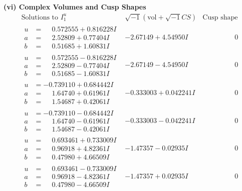 \documentclass[1p]{elsarticle_modified}
\theoremstyle{definition}
\newcommand{\I}{\sqrt{-1}}
\begin{document}
\newpage\flushleft \textbf{(vi) Complex Volumes and Cusp Shapes}
$$\begin{array}{c|c|c}  
\text{Solutions to }I^u_{1}& \I (\text{vol} + \sqrt{-1}CS) & \text{Cusp shape}\\
 \hline 
\begin{aligned}
u &= \phantom{-}0.572555 + 0.816228 I \\
a &= \phantom{-}2.52809 + 0.77404 I \\
b &= \phantom{-}0.51685 + 1.60831 I\end{aligned}
 & -2.67149 + 4.54950 I & \phantom{-0.000000 } 0 \\ \hline\begin{aligned}
u &= \phantom{-}0.572555 - 0.816228 I \\
a &= \phantom{-}2.52809 - 0.77404 I \\
b &= \phantom{-}0.51685 - 1.60831 I\end{aligned}
 & -2.67149 - 4.54950 I & \phantom{-0.000000 } 0 \\ \hline\begin{aligned}
u &= -0.739110 + 0.684442 I \\
a &= \phantom{-}1.64740 + 0.61961 I \\
b &= \phantom{-}1.54687 + 0.42061 I\end{aligned}
 & -0.333003 + 0.042241 I & \phantom{-0.000000 } 0 \\ \hline\begin{aligned}
u &= -0.739110 - 0.684442 I \\
a &= \phantom{-}1.64740 - 0.61961 I \\
b &= \phantom{-}1.54687 - 0.42061 I\end{aligned}
 & -0.333003 - 0.042241 I & \phantom{-0.000000 } 0 \\ \hline\begin{aligned}
u &= \phantom{-}0.693461 + 0.733009 I \\
a &= \phantom{-}0.96918 + 4.82361 I \\
b &= \phantom{-}0.47980 + 4.66509 I\end{aligned}
 & -1.47357 - 0.02935 I & \phantom{-0.000000 } 0 \\ \hline\begin{aligned}
u &= \phantom{-}0.693461 - 0.733009 I \\
a &= \phantom{-}0.96918 - 4.82361 I \\
b &= \phantom{-}0.47980 - 4.66509 I\end{aligned}
 & -1.47357 + 0.02935 I & \phantom{-0.000000 } 0 \\ \hline\begin{aligned}

\end{aligned}
\end{array}$$
\end{document}
